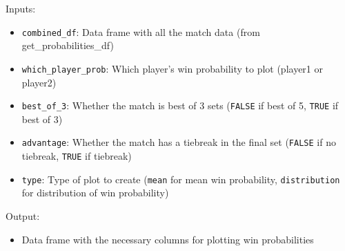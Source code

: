 \documentclass[
  letterpaper,
  DIV=11,
  numbers=noendperiod]{scrartcl}
\providecommand{\tightlist}{%
  \setlength{\itemsep}{0pt}\setlength{\parskip}{0pt}}\usepackage{longtable,booktabs,array}
\begin{document}
Inputs:

\begin{itemize}
\tightlist
\item
  \texttt{combined\_df}: Data frame with all the match data (from
  get\_probabilities\_df)
\item
  \texttt{which\_player\_prob}: Which player's win probability to plot
  (player1 or player2)
\item
  \texttt{best\_of\_3}: Whether the match is best of 3 sets
  (\texttt{FALSE} if best of 5, \texttt{TRUE} if best of 3)
\item
  \texttt{advantage}: Whether the match has a tiebreak in the final set
  (\texttt{FALSE} if no tiebreak, \texttt{TRUE} if tiebreak)
\item
  \texttt{type}: Type of plot to create (\texttt{mean} for mean win
  probability, \texttt{distribution} for distribution of win
  probability)
\end{itemize}

Output:

\begin{itemize}
\tightlist
\item
  Data frame with the necessary columns for plotting win probabilities
\end{itemize}

\linespread{0.9}
\end{document}
